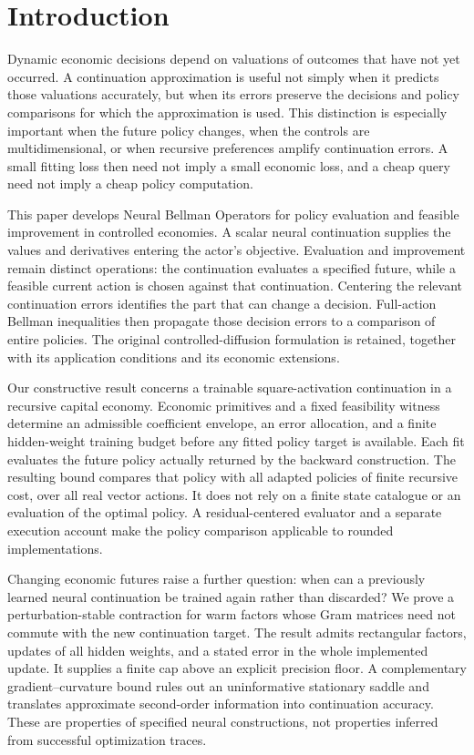 \section{Introduction}\label{sec:r34introduction}
Dynamic economic decisions depend on valuations of outcomes that have not yet
occurred. A continuation approximation is useful not simply when it predicts
those valuations accurately, but when its errors preserve the decisions and
policy comparisons for which the approximation is used. This distinction is
especially important when the future policy changes, when the controls are
multidimensional, or when recursive preferences amplify continuation errors.
A small fitting loss then need not imply a small economic loss, and a cheap
query need not imply a cheap policy computation.

This paper develops Neural Bellman Operators for policy evaluation and
feasible improvement in controlled economies. A scalar neural continuation
supplies the values and derivatives entering the actor's objective. Evaluation
and improvement remain distinct operations: the continuation evaluates a
specified future, while a feasible current action is chosen against that
continuation. Centering the relevant continuation errors identifies the part
that can change a decision. Full-action Bellman inequalities then propagate
those decision errors to a comparison of entire policies. The original
controlled-diffusion formulation is retained, together with its application
conditions and its economic extensions.

Our constructive result concerns a trainable square-activation continuation
in a recursive capital economy. Economic primitives and a fixed feasibility
witness determine an admissible coefficient envelope, an error allocation,
and a finite hidden-weight training budget before any fitted policy target
is available. Each fit evaluates the future policy actually returned by the
backward construction. The resulting bound compares that policy with all
adapted policies of finite recursive cost, over all real vector actions.
It does not rely on a finite state catalogue or an evaluation of the optimal
policy. A residual-centered evaluator and a separate execution account make
the policy comparison applicable to rounded implementations.

Changing economic futures raise a further question: when can a previously
learned neural continuation be trained again rather than discarded? We prove
a perturbation-stable contraction for warm factors whose Gram matrices need
not commute with the new continuation target. The result admits rectangular
factors, updates of all hidden weights, and a stated error in the whole
implemented update. It supplies a finite cap above an explicit precision
floor. A complementary gradient--curvature bound rules out an uninformative
stationary saddle and translates approximate second-order information into
continuation accuracy. These are properties of specified neural
constructions, not properties inferred from successful optimization traces.

